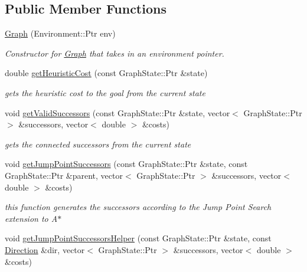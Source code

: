 \subsection*{\-Public \-Member \-Functions}
\begin{DoxyCompactItemize}
\item 
\hypertarget{class_graph_af17d59fad8e889152f8367600d1a6094}{\hyperlink{class_graph_af17d59fad8e889152f8367600d1a6094}{\-Graph} (\-Environment\-::\-Ptr env)}\label{class_graph_af17d59fad8e889152f8367600d1a6094}

\begin{DoxyCompactList}\small\item\em \-Constructor for \hyperlink{class_graph}{\-Graph} that takes in an environment pointer. \end{DoxyCompactList}\item 
double \hyperlink{class_graph_a24c1e21da4bb89a29539a2a1d3c6baed}{get\-Heuristic\-Cost} (const \-Graph\-State\-::\-Ptr \&state)
\begin{DoxyCompactList}\small\item\em gets the heuristic cost to the goal from the current state \end{DoxyCompactList}\item 
void \hyperlink{class_graph_a52790947468f8dbfa5c28bc1de1ba9b8}{get\-Valid\-Successors} (const \-Graph\-State\-::\-Ptr \&state, vector$<$ \-Graph\-State\-::\-Ptr $>$ \&successors, vector$<$ double $>$ \&costs)
\begin{DoxyCompactList}\small\item\em gets the connected successors from the current state \end{DoxyCompactList}\item 
void \hyperlink{class_graph_a9bbc9806e8a42d086876e391aa0c575a}{get\-Jump\-Point\-Successors} (const \-Graph\-State\-::\-Ptr \&state, const \-Graph\-State\-::\-Ptr \&parent, vector$<$ \-Graph\-State\-::\-Ptr $>$ \&successors, vector$<$ double $>$ \&costs)
\begin{DoxyCompactList}\small\item\em this function generates the successors according to the \-Jump \-Point \-Search extension to \-A$\ast$ \end{DoxyCompactList}\item 
void \hyperlink{class_graph_a34cb4ef99f09f6aa3330eaa88e097f31}{get\-Jump\-Point\-Successors\-Helper} (const \-Graph\-State\-::\-Ptr \&state, const \hyperlink{class_direction}{\-Direction} \&dir, vector$<$ \-Graph\-State\-::\-Ptr $>$ \&successors, vector$<$ double $>$ \&costs)

\end{DoxyCompactItemize}
